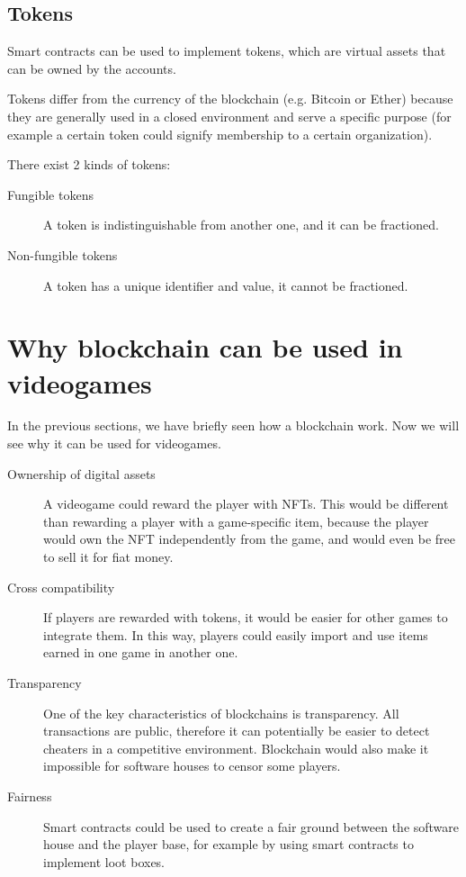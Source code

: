 \documentclass[12pt]{article}
\begin{document}
\subsection{Tokens} \label{subsection:tokens}
Smart contracts can be used to implement tokens, which are virtual assets that can be owned by the accounts.

Tokens differ from the currency of the blockchain (e.g. Bitcoin or Ether) because they are generally used in a closed environment and serve a specific purpose (for example a certain token could signify membership to a certain organization).

There exist 2 kinds of tokens:
\begin{description}
    \item[Fungible tokens] A token is indistinguishable from another one, and it can be fractioned. 
    \item[Non-fungible tokens] A token has a unique identifier and value, it cannot be fractioned. 
\end{description}

\section{Why blockchain can be used in videogames} \label{section:wbcbuiv}
In the previous sections, we have briefly seen how a blockchain work. Now we will see why it can be used for videogames.
\begin{description}
    \item[Ownership of digital assets] A videogame could reward the player with NFTs. This would be different than rewarding a player with a game-specific item, because the player would own the NFT independently from the game, and would even be free to sell it for fiat money.
    \item[Cross compatibility] If players are rewarded with tokens, it would be easier for other games to integrate them. In this way, players could easily import and use items earned in one game in another one.
    \item[Transparency] One of the key characteristics of blockchains is transparency. All transactions are public, therefore it can potentially be easier to detect cheaters in a competitive environment. Blockchain would also make it impossible for software houses to censor some players.
    \item[Fairness] Smart contracts could be used to create a fair ground between the software house and the player base, for example by using smart contracts to implement loot boxes.  
\end{description}
\end{document}
